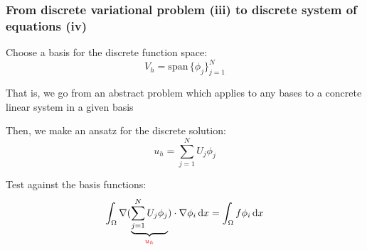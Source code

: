 \begin{frame}
  \frametitle{From discrete variational problem (iii) to discrete
    system of equations (iv)}

  Choose a basis for the discrete function space:
  \begin{equation*}
    V_h = \mathrm{span} \, \{\phi_j\}_{j=1}^N
  \end{equation*}

  That is, we go from an abstract problem which applies to any bases to a concrete linear system in a given basis

  \vspace{0.3cm}
  Then, we make an ansatz for the discrete solution:
  \begin{equation*}
    u_h = \sum_{j=1}^N U_j \phi_j
  \end{equation*}

  Test against the basis functions:
  \begin{equation*}
    \int_{\Omega} \nabla
    (\underbrace{\sum_{j=1}^N U_j \phi_j}_{\textcolor{red}{u_h}})
    \cdot \nabla \phi_i \, \mathrm{d}x = \int_{\Omega} f \phi_i \, \mathrm{d}x
  \end{equation*}

\end{frame}
